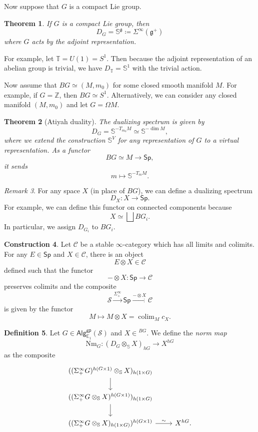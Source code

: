 \documentclass[10pt]{amsart}
\newtheorem{thm}{Theorem}[subsection]
\theoremstyle{definition}
\newtheorem{defn}[thm]{Definition}
\newtheorem{con}[thm]{Construction}
\theoremstyle{remark}
\newtheorem{rmk}[thm]{Remark}
\theoremstyle{plain}
\theoremstyle{definition}
\theoremstyle{remark}
\newcommand{\Z}{\mathbb{Z}}
\newcommand{\E}{\mathbb{E}}
\newcommand{\bS}{\mathbb{S}}
\newcommand{\g}{\mathfrak{g}}
\newcommand{\mc}[1]{\mathcal{#1}}
\newcommand{\T}{\mathbb{T}}
\newcommand{\mr}[1]{\mathrm{#1}}
\newcommand{\ms}[1]{\mathsf{#1}}
\newcommand{\1}{\mathbf{1}}
\newcommand{\2}{\mathbf{2}}
\newcommand{\3}{\mathbf{3}}
\DeclareMathOperator*{\colim}{colim}
\begin{document}
Now suppose that $G$ is a compact Lie group.
\begin{thm}
    If $G$ is a compact Lie group, then
    \[ D_G = \bS^{\g} \coloneqq \Sigma^{\infty}(\g^+) \]
    where $G$ acts by the adjoint representation.
\end{thm}

For example, let $\T = U(1) = S^1$. Then because the adjoint representation of an abelian group is trivial, we have $D_{\T} = \bS^1$ with the trivial action.

Now assume that $BG \simeq (M, m_0)$ for some closed smooth manifold $M$. For example, if $G = \Z$, then $BG \simeq S^1$. Alternatively, we can consider any closed manifold $(M, m_0)$ and let $G = \Omega M$.

\begin{thm}[Atiyah duality]
    The dualizing spectrum is given by
    \[ D_G = \bS^{-T_{m_0} M} \simeq \bS^{-\dim M}, \]
    where we extend the construction $\bS^V$ for any representation of $G$ to a virtual representation. As a functor
    \[ BG \simeq M \to \ms{Sp}, \]
    it sends 
    \[ m \mapsto \bS^{-T_m M}. \]
\end{thm}

\begin{rmk}
    For any space $X$ (in place of $BG$), we can define a dualizing spectrum
    \[ D_X \colon X \to \ms{Sp}. \]
    For example, we can define this functor on connected components because
    \[ X \simeq \bigsqcup B G_i. \]
    In particular, we assign $D_{G_i}$ to $BG_i$.
\end{rmk}

\begin{con}
    Let $\mc{C}$ be a stable $\infty$-category which has all limits and colimits. For any $E \in \ms{Sp}$ and $X \in \mc{C}$, there is an object
    \[ E \otimes X \in \mc{C} \]
    defined such that the functor
    \[ - \otimes X \colon \ms{Sp} \to \mc{C} \]
    preserves colimits and the composite
    \[ \mc{S} \xrightarrow{\Sigma_+^{\infty}} \ms{Sp} \xrightarrow{- \otimes X} \mc{C} \]
    is given by the functor
    \[ M \mapsto M \otimes X = \colim_M c_X. \]
\end{con}

\begin{defn}
    Let $G \in \ms{Alg}_{\E_1}^{\ms{gp}} (\mc{S})$ and $X \in \mc{}^{BG}$. We define the \textit{norm map}
    \[ \mr{Nm}_G \colon (D_G \otimes_{\bS} X)_{hG} \to X^{hG} \]
    as the composite
    \begin{equation*}
    \begin{tikzcd}
        ((\Sigma_+^{\infty} G)^{h(G\times 1)} \otimes_{\bS} X)_{h(1 \times G)} \ar{d} \\
        ((\Sigma_+^{\infty} G \otimes_{\bS} X)^{h(G \times 1)})_{h(1 \times G)} \ar{d} \\
        ((\Sigma_+^{\infty} G \otimes_{\bS} X)_{h(1 \times G)})^{h(G \times 1)} \ar{r}{\sim} & X^{hG}.
    \end{tikzcd}
    \end{equation*}
\end{defn}
\end{document}
